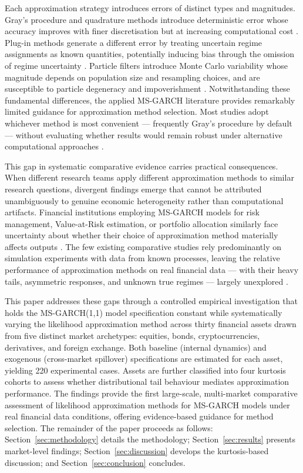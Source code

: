 \documentclass[12pt, a4paper]{article}
\begin{document}
Each approximation strategy introduces errors of distinct types and magnitudes. Gray's procedure and quadrature methods introduce deterministic error whose accuracy improves with finer discretisation but at increasing computational cost \citep{Haas2004, Augustyniak2014}. Plug-in methods generate a different error by treating uncertain regime assignments as known quantities, potentially inducing bias through the omission of regime uncertainty \citep{Durbin2012}. Particle filters introduce Monte Carlo variability whose magnitude depends on population size and resampling choices, and are susceptible to particle degeneracy and impoverishment \citep{Doucet2001, Pitt1999}. Notwithstanding these fundamental differences, the applied MS-GARCH literature provides remarkably limited guidance for approximation method selection. Most studies adopt whichever method is most convenient — frequently Gray's procedure by default — without evaluating whether results would remain robust under alternative computational approaches \citep{Augustyniak2014, Catania2019, Ardia2019}.

This gap in systematic comparative evidence carries practical consequences. When different research teams apply different approximation methods to similar research questions, divergent findings emerge that cannot be attributed unambiguously to genuine economic heterogeneity rather than computational artifacts. Financial institutions employing MS-GARCH models for risk management, Value-at-Risk estimation, or portfolio allocation similarly face uncertainty about whether their choice of approximation method materially affects outputs \citep{Ardia2018, Guidolin2007}. The few existing comparative studies rely predominantly on simulation experiments with data from known processes, leaving the relative performance of approximation methods on real financial data — with their heavy tails, asymmetric responses, and unknown true regimes — largely unexplored \citep{Augustyniak2014}.

This paper addresses these gaps through a controlled empirical investigation that holds the MS-GARCH(1,1) model specification constant while systematically varying the likelihood approximation method across thirty financial assets drawn from five distinct market archetypes: equities, bonds, cryptocurrencies, derivatives, and foreign exchange. Both baseline (internal dynamics) and exogenous (cross-market spillover) specifications are estimated for each asset, yielding 220 experimental cases. Assets are further classified into four kurtosis cohorts to assess whether distributional tail behaviour mediates approximation performance. The findings provide the first large-scale, multi-market comparative assessment of likelihood approximation methods for MS-GARCH models under real financial data conditions, offering evidence-based guidance for method selection. The remainder of the paper proceeds as follows: Section~\ref{sec:methodology} details the methodology; Section~\ref{sec:results} presents market-level findings; Section~\ref{sec:discussion} develops the kurtosis-based discussion; and Section~\ref{sec:conclusion} concludes.
\end{document}
